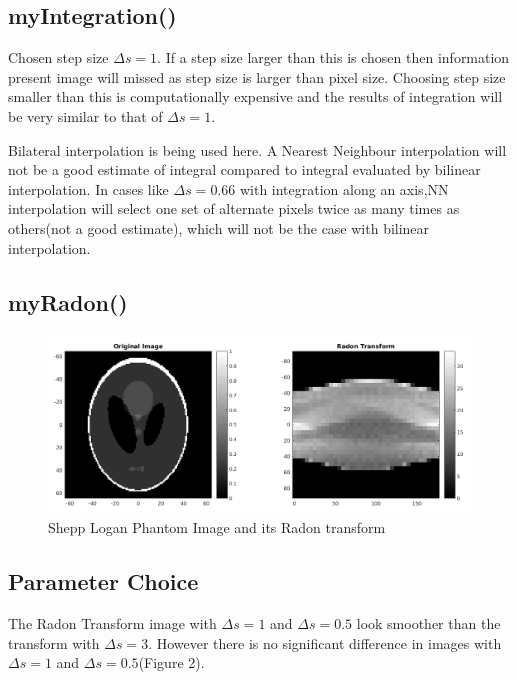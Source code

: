 \documentclass[11pt]{article}
\begin{document}
\maketitle

\subsection{myIntegration()}
Chosen step size $\Delta s = 1$. If a step size larger than this is chosen then information present image will missed as step size is larger than pixel size.
Choosing step size smaller than this is computationally expensive and the results of integration will be very similar to that of $\Delta s = 1$.

Bilateral interpolation is being used here. A Nearest Neighbour interpolation will not be a good estimate of integral compared to integral evaluated by bilinear interpolation.
In cases like $\Delta s = 0.66$ with integration along an axis,NN interpolation will select one set of alternate pixels twice as many times as others(not a good estimate), which will not be the case with bilinear interpolation.
\subsection{myRadon()}

\begin{figure}[h]
\centering
\includegraphics[scale=0.4]{b}
\caption{Shepp Logan Phantom Image and its Radon transform}
\end{figure}

\subsection{Parameter Choice}
The Radon Transform image with $\Delta s=1$ and $\Delta s=0.5$ look smoother than the transform with $\Delta s=3$. 
However there is no significant difference in images with $\Delta s=1$ and $\Delta s=0.5$(Figure 2).
\end{document}
